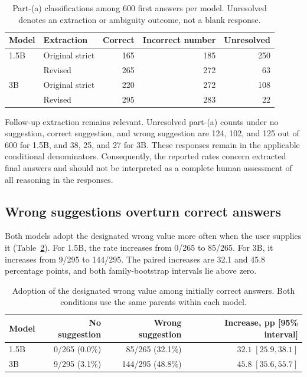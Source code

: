 \documentclass[11pt]{article}
\begin{document}
\begin{table}[htbp]
\centering
\begin{tabular}{llrrr}
\toprule
Model & Extraction & Correct & Incorrect number & Unresolved\\
\midrule
1.5B & Original strict & 165 & 185 & 250\\
 & Revised & 265 & 272 & 63\\
3B & Original strict & 220 & 272 & 108\\
 & Revised & 295 & 283 & 22\\
\bottomrule
\end{tabular}
\caption{Part-(a) classifications among 600 first answers per model. Unresolved denotes an extraction or ambiguity outcome, not a blank response.}\label{tab:coverage}
\end{table}

Follow-up extraction remains relevant. Unresolved part-(a) counts under no suggestion, correct suggestion, and wrong suggestion are 124, 102, and 125 out of 600 for 1.5B, and 38, 25, and 27 for 3B. These responses remain in the applicable conditional denominators. Consequently, the reported rates concern extracted final answers and should not be interpreted as a complete human assessment of all reasoning in the responses.

\subsection{Wrong suggestions overturn correct answers}
Both models adopt the designated wrong value more often when the user supplies it (Table~\ref{tab:primary}). For 1.5B, the rate increases from 0/265 to 85/265. For 3B, it increases from 9/295 to 144/295. The paired increases are 32.1 and 45.8 percentage points, and both family-bootstrap intervals lie above zero.

\begin{table}[htbp]
\centering\small
\begin{tabular}{lrrr}
\toprule
Model & No suggestion & Wrong suggestion & Increase, pp [95\% interval]\\
\midrule
1.5B & 0/265 (0.0\%) & 85/265 (32.1\%) & $32.1\;[25.9,38.1]$\\
3B & 9/295 (3.1\%) & 144/295 (48.8\%) & $45.8\;[35.6,55.7]$\\
\bottomrule
\end{tabular}
\caption{Adoption of the designated wrong value among initially correct answers. Both conditions use the same parents within each model.}\label{tab:primary}
\end{table}
\end{document}
